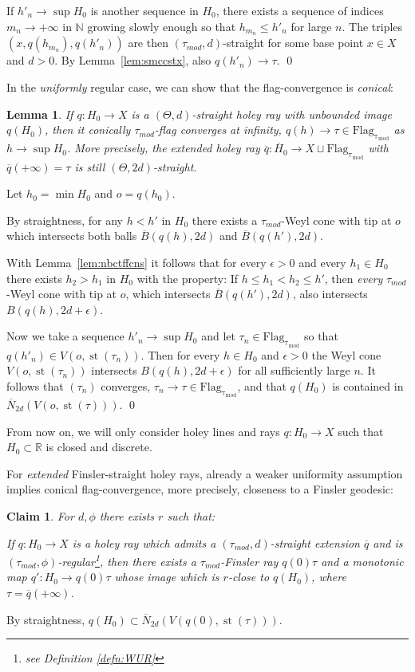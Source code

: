 \documentclass[12pt]{article}
\theoremstyle{boldplain}
\newtheorem{claim}[equation]{Claim}
\newtheorem{lem}[equation]{Lemma}
\theoremstyle{bolddefinition}
\numberwithin{equation}{section}
\def\R{{\mathbb R}}
\def\N{{\mathbb N}}
\def\eps{\epsilon}
\def\Flagt{\operatorname{Flag_{\tau_{mod}}}}
\def\ol{\overline}
\def\st{\operatorname{st}}
\def\taumod{\tau_{mod}}
\def\mini{\scriptsize}
\begin{document}
If $h'_n\to\sup H_0$ is another sequence in $H_0$,
there exists a sequence of indices $m_n\to+\infty$ in $\N$ growing slowly enough so that $h_{m_n}\leq h'_n$ for large $n$.
The triples $(x,q(h_{m_n}),q(h'_n))$ are then $(\taumod,d)$-straight for some base point $x\in X$ and $d>0$.
By Lemma~\ref{lem:smccstx},
also $q(h'_n)\to\tau$.
\qed

\medskip
In the {\em uniformly} regular case, we can show that the flag-convergence is {\em conical}:
\begin{lem}
\label{lem:rgstrhrcnvcncl}
If $q:H_0\to X$ is a $(\Theta,d)$-straight holey ray
with unbounded image $q(H_0)$,
then it conically $\taumod$-flag converges at infinity,
$q(h)\to\tau\in\Flagt$  as $h\to\sup H_0$.
More precisely,
the extended holey ray $\ol q:\ol H_0\to X\sqcup\Flagt$ with $\ol q(+\infty)=\tau$ 
is still $(\Theta,2d)$-straight.
\end{lem}
\proof
Let $h_0=\min H_0$ and $o=q(h_0)$.

By straightness,
for any $h<h'$ in $H_0$ there exists a $\taumod$-Weyl cone with tip at $o$
which intersects both balls $\ol B(q(h),2d)$ and $\ol B(q(h'),2d)$.

With Lemma~\ref{lem:nbctffcns} it follows that
for every $\eps>0$ and every $h_1\in H_0$ there exists $h_2>h_1$ in $H_0$ with the property:
If $h\leq h_1<h_2\leq h'$, then {\em every} $\taumod$-Weyl cone with tip at $o$,
which intersects $\ol B(q(h'),2d)$, also intersects $B(q(h),2d+\eps)$.

Now we take a sequence $h'_n\to\sup H_0$
and let $\tau_n\in\Flagt$ so that $q(h'_n)\in V(o,\st(\tau_n))$.
Then for every $h\in H_0$ and $\eps>0$ the Weyl cone $V(o,\st(\tau_n))$ 
intersects $B(q(h),2d+\eps)$ for all sufficiently large $n$.
It follows that $(\tau_n)$ converges, $\tau_n\to\tau\in\Flagt$,
and that $q(H_0)$ is contained in $\ol N_{2d}(V(o,\st(\tau)))$.
\qed


\medskip
{From now on, we will only consider holey lines and rays $q:H_0\to X$ such 
that $H_0\subset \R$ is closed and discrete.} 




For {\em extended} Finsler-straight holey rays,
already a weaker uniformity assumption implies conical flag-convergence,
more precisely, closeness to a Finsler geodesic:

\begin{claim}
\label{claim:strghtphrgclfns}
For $d,\phi$ there exists $r$ such that:

If $q:H_0\to X$ is a holey ray
which admits a 
$(\taumod,d)$-straight extension $\ol q$
and is $(\taumod,\phi)$-regular\footnote{see Definition \ref{defn:WUR}}, 
then there exists a $\taumod$-Finsler ray $q(0)\tau$ and a monotonic map $q':H_0\to q(0)\tau$ {whose image} 
{\mini which} is $r$-close to {$q(H_0)$},
where $\tau=\ol q(+\infty)$.
\end{claim}
\proof
By straightness, $q(H_0)\subset\ol N_{2d}(V(q(0),\st(\tau)))$.
\end{document}
